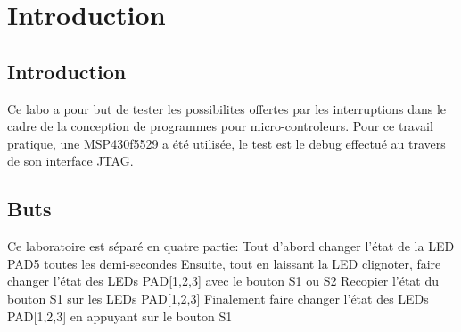 \section*{Introduction}

\subsection*{Introduction}
Ce labo a pour but de tester les possibilites offertes par les interruptions dans le cadre de la conception de programmes pour micro-controleurs.
Pour ce travail pratique, une MSP430f5529 a été utilisée, le test est le debug effectué au travers de son interface JTAG.

\subsection{Buts}
Ce laboratoire est séparé en quatre partie:
Tout d'abord changer l'état de la LED PAD5 toutes les demi-secondes
Ensuite, tout en laissant la LED clignoter, faire changer l'état des LEDs PAD[1,2,3] avec le bouton S1 ou S2
Recopier l'état du bouton S1 sur les LEDs PAD[1,2,3]
Finalement faire changer l'état des LEDs PAD[1,2,3] en appuyant sur le bouton S1
